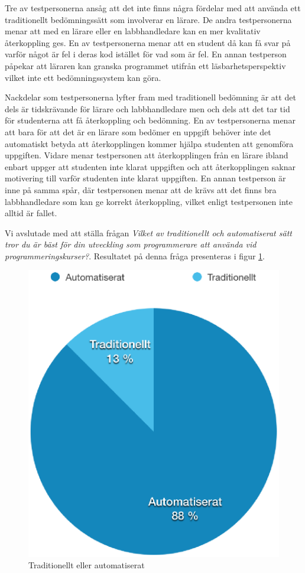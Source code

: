 \documentclass[a4paper,11pt]{article}
\begin{document}
{Tre av testpersonerna ansåg att det inte finns några fördelar med att använda ett traditionellt bedömningssätt som involverar en lärare. De andra testpersonerna menar att med en lärare eller en labbhandledare kan en mer kvalitativ återkoppling ges. En av testpersonerna menar att en student då kan få svar på varför något är fel i deras kod istället för vad som är fel. En annan testperson påpekar att läraren kan granska programmet utifrån ett läsbarhetsperspektiv vilket inte ett bedömningssystem kan göra.

Nackdelar som testpersonerna lyfter fram med traditionell bedömning är att det dels är tidskrävande för lärare och labbhandledare men och dels att det tar tid för studenterna att få återkoppling och bedömning. En av testpersonerna menar att bara för att det är en lärare som bedömer en uppgift behöver inte det automatiskt betyda att återkopplingen kommer hjälpa studenten att genomföra uppgiften. Vidare menar testpersonen att återkopplingen från en lärare ibland enbart uppger att studenten inte klarat uppgiften och att återkopplingen saknar motivering till varför studenten inte klarat uppgiften. En annan testperson är inne på samma spår, där testpersonen menar att de krävs att det finns bra labbhandledare som kan ge korrekt återkoppling, vilket enligt testpersonen inte alltid är fallet.

Vi avslutade med att ställa frågan \textit{Vilket av traditionellt och automatiserat sätt tror du är bäst för din utveckling som programmerare att använda vid programmeringskurser?}. Resultatet på denna fråga presenteras i figur \ref{fig:TradvsAuto}.

\begin{figure}[ht!]
\centering
\includegraphics[scale=0.5]{trad_vs_auto.eps}
\caption{Traditionellt eller automatiserat}
\label{fig:TradvsAuto}
\end{figure}

}
\end{document}
